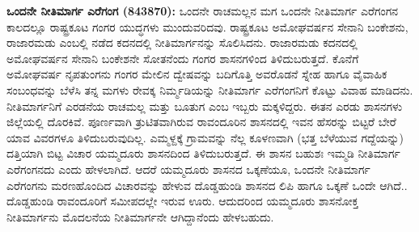 \textbf{ಒಂದನೇ ನೀತಿಮಾರ್ಗ ಎರೆಗಂಗ (843\general{\enginline{-}}870):} ಒಂದನೇ ರಾಚಮಲ್ಲನ ಮಗ ಒಂದನೇ ನೀತಿಮಾರ್ಗ ಎರೆಗಂಗನ ಕಾಲದಲ್ಲೂ ರಾಷ್ಟ್ರಕೂಟ ಗಂಗರ ಯುದ್ಧಗಳು ಮುಂದುವರಿದವು. ರಾಷ್ಟ್ರಕೂಟ ಅಮೋಘವರ್ಷನ ಸೇನಾನಿ ಬಂಕೇಶನು, ರಾಜಾರಮಡು ಎಂಬಲ್ಲಿ ನಡೆದ ಕದನದಲ್ಲಿ ನೀತಿಮಾರ್ಗನನ್ನು ಸೊಲಿಸಿದನು. ರಾಜಾರಮಡು ಕದನದಲ್ಲಿ ಅಮೋಘವರ್ಷನ ಸೇನಾನಿ ಬಂಕೇಶನೇ ಸೋತನೆಂದು ಗಂಗರ ಶಾಸನಗಳಿಂದ ತಿಳಿದುಬರುತ್ತದೆ. ಕೊನೆಗೆ ಅಮೋಘವರ್ಷ ನೃಪತುಂಗನು ಗಂಗರ ಮೇಲಿನ ದ್ವೇಷವನ್ನು ಬದಿಗೊತ್ತಿ ಅವರೊಡನೆ ಸ್ನೇಹ ಹಾಗೂ ವೈವಾಹಿಕ ಸಂಬಂಧವನ್ನು ಬೆಳೆಸಿ ತನ್ನ ಮಗಳು ರೇವಕ್ಕ ನಿರ್ಮ್ಮಡಿಯನ್ನು ನೀತಿಮಾರ್ಗ ಎರೆಗಂಗನಿಗೆ ಕೊಟ್ಟು ವಿವಾಹ ಮಾಡಿದನು. ನೀತಿಮಾರ್ಗನಿಗೆ ಎರಡನೆಯ ರಾಚಮಲ್ಲ ಮತ್ತು ಬೂತುಗ ಎಂಬ ಇಬ್ಬರು ಮಕ್ಕಳಿದ್ದರು. ಈತನ ಎರಡು ಶಾಸನಗಳು ಜಿಲ್ಲೆಯಲ್ಲಿ ದೊರಕಿವೆ. ಪೂರ್ಣವಾಗಿ ತ್ರುಟಿತವಾಗಿರುವ ರಾವಂದೂರಿನ ಶಾಸನದಲ್ಲಿ ಇವನ ಹೆಸರನ್ನು ಬಿಟ್ಟರೆ ಬೇರೆ ಯಾವ ವಿವರಗಳೂ ತಿಳಿದುಬರುವುದಿಲ್ಲ. ಎಮ್ಮಳ್ದಕ್ಕೆ ಗ್ರಾಮವನ್ನು ನೆಲ್ಲ ಕೂಳಣವಾಗಿ (ಭತ್ತ ಬೆಳೆಯುವ ಗದ್ದೆಯನ್ನು) ದತ್ತಿಯಾಗಿ ಬಿಟ್ಟ ವಿಚಾರ ಯಮ್ಮದೂರು ಶಾಸನದಿಂದ ತಿಳಿದುಬರುತ್ತದೆ. ಈ ಶಾಸನ ಬಹುಶಃ ಇಮ್ಮಡಿ ನೀತಿಮಾರ್ಗ ಎರೆಗಂಗನದು ಎಂದು ಹೇಳಲಾಗಿದೆ. ಆದರೆ ಯಮ್ಮದೂರು ಶಾಸನದ ಒಕ್ಕಣೆಯೂ, ಒಂದನೇ ನೀತಿಮಾರ್ಗ ಎರೆಗಂಗನು ಮರಣಹೊಂದಿದ ವಿಚಾರವನ್ನು ಹೇಳುವ ದೊಡ್ಡಹುಂಡಿ ಶಾಸನದ ಲಿಪಿ ಹಾಗೂ ಒಕ್ಕಣೆ ಒಂದೇ ಆಗಿದೆ.. ದೊಡ್ಡಹುಂಡಿ ರಾವಂದೂರಿಗೆ ಸಮೀಪದಲ್ಲೇ ಇರುವ ಊರು. ಆದುದರಿಂದ ಯಮ್ಮದೂರು ಶಾಸನೋಕ್ತ ನೀತಿಮಾರ್ಗನು ಮೊದಲನೆಯ ನೀತಿಮಾರ್ಗನೇ ಆಗಿದ್ದಾನೆಂದು ಹೇಳಬಹುದು.

